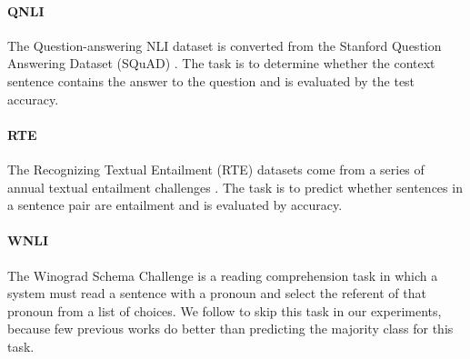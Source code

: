 \documentclass[11pt,a4paper]{article}
\begin{document}
\paragraph{QNLI} The Question-answering NLI dataset is converted from the Stanford Question Answering Dataset (SQuAD) \citep{rajpurkar2016squad}. The task is to determine whether the context sentence contains
the answer to the question and is evaluated by the test accuracy.

\paragraph{RTE} The Recognizing Textual Entailment (RTE) datasets come from a series of annual textual entailment challenges \citep{bentivogli2009fifth}. The task is to predict whether sentences in a sentence pair are entailment and is evaluated by accuracy.

\paragraph{WNLI} The Winograd Schema Challenge \citep{levesque2011winograd} is a reading comprehension task in which a system must read a sentence with a pronoun and select the referent of that pronoun from a list of choices. We follow \citet{devlin2018bert} to skip this task in our experiments, because few previous works do better than predicting the majority class for this task.
\end{document}
